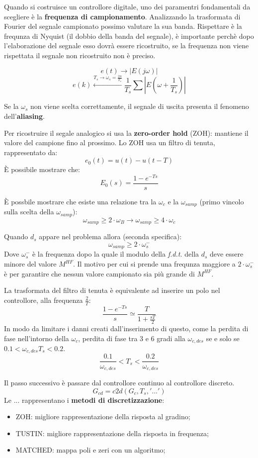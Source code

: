 \documentclass[12pt]{article}
\begin{document}
Quando si costruisce un controllore digitale, uno dei paramentri fondamentali da scegliere \`e la \textbf{frequenza di campionamento}. Analizzando la trasformata di Fourier del segnale campionato possimo valutare la sua banda. Rispettare \`e la frequnza di Nyquist (il dobbio della banda del segnale), \`e importante perch\`e dopo l'elaborazione del segnale esso dovr\`a essere ricostruito, se la frequenza non viene rispettata il segnale non ricostruito non \`e preciso.

\[ e(t) \longrightarrow |E(j\omega)|  \]
\[ e(k) \overset{T_s \to \omega_s = \frac{2\pi}{T_s}}{\longleftarrow} \frac{1}{T_s} \sum \left| E \left( \omega + \frac{1}{T_s} \right)  \right| \]

Se la $\omega_s$ non viene scelta correttamente, il segnale di uscita presenta il fenomeno dell'\textbf{aliasing}.

Per ricostruire il segale analogico si usa la \textbf{zero-order hold} (ZOH): mantiene il valore del campione fino al prossimo. Lo ZOH usa un filtro di tenuta, rappresentato da:
\[ e_0(t) = u(t) - u(t-T) \]
\`E possibile mostrare che:
\[ E_0(s) = \frac{1-e^{-Ts}}{s}  \]

\`E possbile mostrare che esiste una relazione tra la $\omega_c$ e la $\omega_{samp}$ (primo vincolo sulla scelta della $\omega_{samp}$):
\[ \boxed{ \omega_{samp} \geqslant 2\cdot\omega_B \to \omega_{samp} \geqslant 4\cdot\omega_c }  \]

Quando $d_s$ appare nel problema allora (seconda specifica):
\[ \omega_{samp} \geqslant  2\cdot\omega_s^{-} \]
Dove $\omega_s^{-}$ \`e la frequenza dopo la quale il modulo della \emph{f.d.t.} della $d_s$ deve essere minore del valore $M^{HF}$. Il motivo per cui si prende una frequnza maggiore a $2\cdot\omega_s^{-}$ \`e per garantire che nessun valore campionato sia pi\`u grande di $M^{HF}$.

La trasformata del filtro di tenuta \`e equivalente ad inserire un polo nel controllore, alla frequenza $\frac{2}{T}$:
\[ \frac{1 - e^{-Ts}}{s} \simeq \frac{T}{1 + \frac{sT}{2} }  \]
In modo da limitare i danni creati dall'inserimento di questo, come la perdita di fase nell'intorno della $\omega_c$, perdita di fase tra 3 e 6 gradi alla $\omega_{c,des}$ se e solo se $ 0.1 < \omega_{c,des}T_s < 0.2 $.
\[ \boxed{\frac{0.1}{\omega_{c,des}} < T_s < \frac{0.2}{\omega_{c,des}} } \]

Il passo successivo \`e passare dal controllore continuo al controllore discreto.
\[ G_{cd} = c2d(G_c, T_s, '...') \]
Le $...$ rappresentano i \textbf{metodi di discretizzazione}:
\begin{itemize}
    \item ZOH: migliore rappresentazione della risposta al gradino;
    \item TUSTIN: migliore rappresentazione della risposta in frequenza;
    \item MATCHED: mappa poli e zeri con un algoritmo;
\end{itemize}
\end{document}
